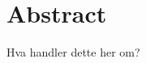 \documentclass[main.tex]{subfiles}
\begin{document}
\section*{Abstract}
Hva handler dette her om?
\end{document}
